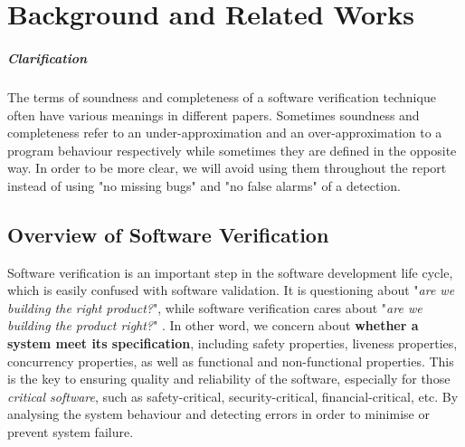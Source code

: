 
\chapter{Background and Related Works}

\paragraph{Clarification} The terms of soundness and completeness of a software verification technique often have various meanings in different papers. Sometimes soundness and completeness refer to an under-approximation and an over-approximation to a program behaviour respectively while sometimes they are defined in the opposite way. In order to be more clear, we will avoid using them throughout the report instead of using "no missing bugs" and "no false alarms" of a detection.  

\section{Overview of Software Verification}
Software verification is an important step in the software development life cycle, which is easily confused with software validation. It is questioning about "\textit{are we building the right product?}", while software verification cares about "\textit{are we building the product right?}" \cite{kung2008software}. In other word, we concern about \textbf{whether a system meet its specification}, including safety properties, liveness properties, concurrency properties, as well as functional and non-functional properties. This is the key to ensuring quality and reliability of the software, especially for those \textit{critical software}, such as safety-critical, security-critical, financial-critical, etc. By analysing the system behaviour and detecting errors in order to minimise or prevent system failure. 



